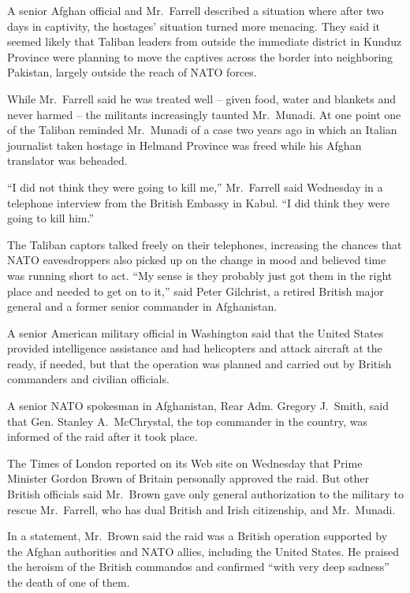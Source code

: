 ﻿\documentclass[12pt]{article}
\begin{document}
A senior Afghan official and Mr.~Farrell described a situation where after two days in captivity,
the hostages' situation turned more menacing\cite{menace}. They said it seemed likely that Taliban
leaders from outside the immediate district in Kunduz Province were planning to move the captives
across the border into neighboring Pakistan, largely outside the reach of NATO forces.

While Mr.~Farrell said he was treated well -- given food, water and blankets and never harmed -- the
militants increasingly taunted Mr.~Munadi. At one point one of the Taliban reminded Mr.~Munadi of a
case two years ago in which an Italian journalist taken hostage in Helmand Province was freed while
his Afghan translator was beheaded.

``I did not think they were going to kill me,'' Mr.~Farrell said Wednesday in a telephone interview
from the British Embassy in Kabul. ``I did think they were going to kill him.''

The Taliban captors talked freely on their telephones, increasing the chances that NATO
eavesdroppers also picked up on the change in mood and believed time was running short to act. ``My
sense is they probably just got them in the right place and needed to get on to it,'' said Peter
Gilchrist, a retired British major general and a former senior commander in Afghanistan.

A senior American military official in Washington said that the United States provided intelligence
assistance and had helicopters and attack aircraft at the ready, if needed, but that the operation
was planned and carried out by British commanders and civilian officials.

A senior NATO spokesman in Afghanistan, Rear Adm. Gregory J.~Smith, said that Gen. Stanley
A.~McChrystal, the top commander in the country, was informed of the raid after it took place.

The Times of London reported on its Web site on Wednesday that Prime Minister Gordon Brown of
Britain personally approved the raid. But other British officials said Mr.~Brown gave only general
authorization to the military to rescue Mr.~Farrell, who has dual British and Irish citizenship, and
Mr.~Munadi.

In a statement, Mr.~Brown said the raid was a British operation supported by the Afghan authorities
and NATO allies, including the United States. He praised the heroism of the British commandos and
confirmed ``with very deep sadness'' the death of one of them.
\end{document}
